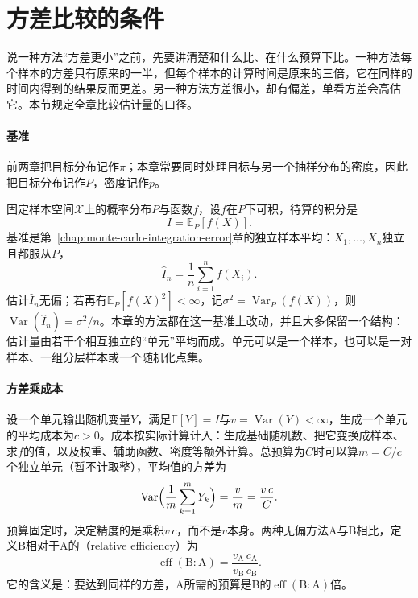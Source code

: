 \section{方差比较的条件}
\label{sec:vr-comparison}

说一种方法“方差更小”之前，先要讲清楚和什么比、在什么预算下比。一种方法每个样本的方差只有原来的一半，但每个样本的计算时间是原来的三倍，它在同样的时间内得到的结果反而更差。另一种方法方差很小，却有偏差，单看方差会高估它。本节规定全章比较估计量的口径。

\paragraph{基准}
前两章把目标分布记作$\pi$；本章常要同时处理目标与另一个抽样分布的密度，因此把目标分布记作$P$，密度记作$p$。

固定样本空间$\mathcal{X}$上的概率分布$P$与函数$f$，设$f$在$P$下可积，待算的积分是
\[
 I=\mathbb{E}_P[f(X)] .
\]
基准是第~\ref{chap:monte-carlo-integration-error}章的独立样本平均：$X_1,\dots,X_n$独立且都服从$P$，
\[
 \hat{I}_n=\frac1n\sum_{i=1}^{n}f(X_i) .
\]
估计$\hat{I}_n$无偏；若再有$\mathbb{E}_P[f(X)^2]<\infty$，记$\sigma^2=\operatorname{Var}_P(f(X))$，则$\operatorname{Var}(\hat{I}_n)=\sigma^2/n$。本章的方法都在这一基准上改动，并且大多保留一个结构：估计量由若干个相互独立的“单元”平均而成。单元可以是一个样本，也可以是一对样本、一组分层样本或一个随机化点集。

\paragraph{方差乘成本}
设一个单元输出随机变量$Y$，满足$\mathbb{E}[Y]=I$与$v=\operatorname{Var}(Y)<\infty$，生成一个单元的平均成本为$c>0$。成本按实际计算计入：生成基础随机数、把它变换成样本、求$f$的值，以及权重、辅助函数、密度等额外计算。总预算为$C$时可以算$m=C/c$个独立单元（暂不计取整），平均值的方差为
\begin{equation}
 \operatorname{Var}\Bigl(\frac1m\sum_{k=1}^{m}Y_k\Bigr)=\frac{v}{m}=\frac{v\,c}{C} .
 \label{eq:vr-work-variance}
\end{equation}
预算固定时，决定精度的是乘积$v\,c$，而不是$v$本身。两种无偏方法A与B相比，定义B相对于A的（relative efficiency）为
\begin{equation}
 \operatorname{eff}(\mathrm{B}:\mathrm{A})=\frac{v_{\mathrm{A}}\,c_{\mathrm{A}}}{v_{\mathrm{B}}\,c_{\mathrm{B}}} .
 \label{eq:vr-relative-efficiency}
\end{equation}
它的含义是：要达到同样的方差，A所需的预算是B的$\operatorname{eff}(\mathrm{B}:\mathrm{A})$倍。

